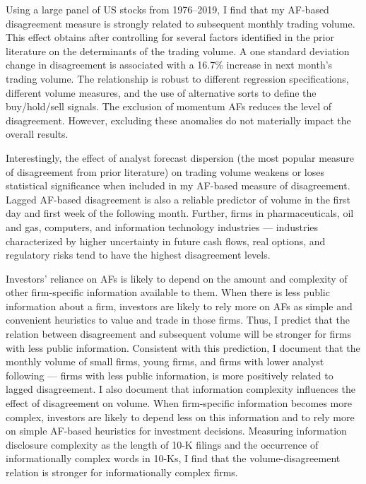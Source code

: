 \documentclass[
  12pt,
  a4paper,
  twoside,
  onecolumn]{article}
\begin{document}
Using a large panel of US stocks from 1976--2019, I find that my
AF-based disagreement measure is strongly related to subsequent monthly
trading volume. This effect obtains after controlling for several
factors identified in the prior literature on the determinants of the
trading volume. A one standard deviation change in disagreement is
associated with a 16.7\% increase in next month's trading volume. The
relationship is robust to different regression specifications, different
volume measures, and the use of alternative sorts to define the
buy/hold/sell signals. The exclusion of momentum AFs reduces the level
of disagreement. However, excluding these anomalies do not materially
impact the overall results.

Interestingly, the effect of analyst forecast dispersion (the most
popular measure of disagreement from prior literature) on trading volume
weakens or loses statistical significance when included in my AF-based
measure of disagreement. Lagged AF-based disagreement is also a reliable
predictor of volume in the first day and first week of the following
month. Further, firms in pharmaceuticals, oil and gas, computers, and
information technology industries --- industries characterized by higher
uncertainty in future cash flows, real options, and regulatory risks
tend to have the highest disagreement levels.

Investors' reliance on AFs is likely to depend on the amount and
complexity of other firm-specific information available to them. When
there is less public information about a firm, investors are likely to
rely more on AFs as simple and convenient heuristics to value and trade
in those firms. Thus, I predict that the relation between disagreement
and subsequent volume will be stronger for firms with less public
information. Consistent with this prediction, I document that the
monthly volume of small firms, young firms, and firms with lower analyst
following --- firms with less public information, is more positively
related to lagged disagreement. I also document that information
complexity influences the effect of disagreement on volume. When
firm-specific information becomes more complex, investors are likely to
depend less on this information and to rely more on simple AF-based
heuristics for investment decisions. Measuring information disclosure
complexity as the length of 10-K filings and the occurrence of
informationally complex words in 10-Ks, I find that the
volume-disagreement relation is stronger for informationally complex
firms.
\end{document}
